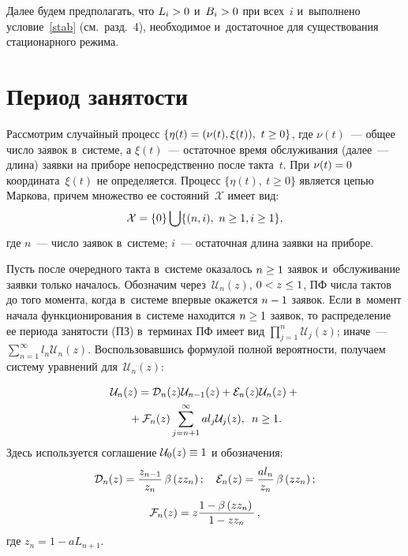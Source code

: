 \begin{multicols}{2}
Далее будем предполагать, что $L_i\hm>0$ и~$B_i\hm>0$ при всех~$i$ 
и~выполнено условие~\eqref{stab} (см.\ разд.~4),
необходимое и~достаточное для существования стационарного режима.
\vspace*{-.5pt}

\section{Период занятости}

Рассмотрим случайный процесс $\{ \eta(t)\hm=(\nu(t),\xi(t)), \ t \hm\ge 
0\}$,
где $\nu(t)$~--- общее число заявок в~системе,
а $\xi(t)$~--- остаточное время обслуживания (далее~--- длина) заявки на 
приборе
непосредственно после такта~$t$. При $\nu(t)\hm=0$
координата~$\xi(t)$ не определяется.
Процесс ${\{\eta(t), \ t\ge0\}}$ является \mbox{цепью} Маркова, причем множество 
ее состояний~$\mathcal{X}$ имеет вид:
$$\mathcal{X}\hm=\{0\} \bigcup \{ (n,i), \ n \hm\ge 1, i \hm\ge 1 \},
$$
где $n$~--- число заявок в~системе; $i$~--- остаточная длина заявки
на приборе.

Пусть после очередного такта в~системе оказалось $n \hm\ge 1$ заявок 
и~обслуживание заявки только началось.
Обозначим через~$\mathcal{U}_{n}(z)$, $0\hm<z\hm\le 1$, ПФ числа тактов 
до того момента, когда в~системе впервые окажется $n\hm-1$ заявок.
Если в~момент начала функционирования в~системе находится $n \hm\ge 1$ 
заявок, то
распределение ее периода занятости (ПЗ) в~терминах ПФ имеет вид 
$\prod\nolimits_{j=1}^n \mathcal{U}_{j}(z)$;
иначе~--- $\sum\nolimits_{n=1}^\infty l_n \mathcal{U}_{n}(z)$.
Воспользовавшись формулой полной вероятности,
получаем систему уравнений для~$\mathcal{U}_{n}(z)$:


\noindent
\begin{multline}
\label{eq1}
\mathcal{U}_{n}(z)
=\mathcal{D}_{n}(z)
\mathcal{U}_{n-1}(z)
+\mathcal{E}_{n}(z)
\mathcal{U}_{n}(z)+{}\\
{}+ \mathcal{F}_{n}(z)
\sum\limits_{j=n+1}^\infty
al_j \mathcal{U}_{j}(z),
\enskip n \ge 1.
\end{multline}
Здесь используется соглашение $\mathcal{U}_{0}(z) \hm\equiv 1$ и
обозначения:
$$
\mathcal{D}_{n}(z)
=
\displaystyle\frac{\displaystyle z_{n-1}\mathstrut}{\displaystyle z_{n}\mathstrut}\,
\beta\left( z z_n \right);
\quad
\mathcal{E}_{n}(z)
=
\displaystyle\frac{\displaystyle al_{n}\mathstrut}{\displaystyle z_{n}\mathstrut}\,
\beta\left( z z_n \right);
$$$$
\mathcal{F}_{n}(z)
=
z\displaystyle\frac{\displaystyle  1- \beta\left( z z_n \right)\mathstrut}{\displaystyle 1-z z_n\mathstrut}\,,
$$
где $z_n=1-aL_{n+1}$.


\end{multicols}
